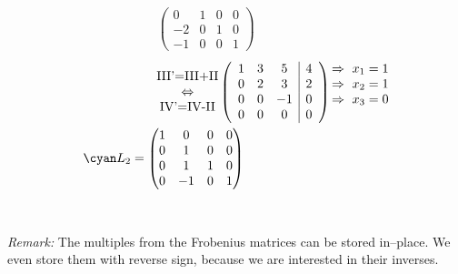 \begin{frame}
{\begin{align*}
{\begin{pmatrix}
				0&1&0&0\\
				-2&0&1&0\\
				-1&0&0&1
				\end{pmatrix}
				\hspace{2cm}
			}
			\end{align*}
			\begin{align*}
			\begin{matrix}
			\text{III'=III+II}\\
			\Leftrightarrow\\
			\text{IV'=IV-II}
			\end{matrix}
			\left(
			\begin{array}{ccc|c}
			1 &3 &5 &4\\
			0 &2 &3 &2\\
			0 &0 &-1&0\\
			0 &0 &0 &0
			\end{array}
			\right)
			\begin{matrix}
			\Rightarrow~x_1=1\\
			\Rightarrow~x_2=1\\
			\Rightarrow~x_3=0\\
			~
			\end{matrix}\\
			{\cyan
				L_2=\begin{pmatrix}
				1&0&0&0\\
				0&1&0&0\\
				0&1&1&0\\
				0&-1&0&1
				\end{pmatrix}
				\hspace{4cm}
			}
			\end{align*}
~\\~\\
\textit{Remark:} The multiples from the Frobenius matrices can be stored in--place. We even store them with reverse sign, because we are interested in their inverses.	
	
}
\end{frame}

